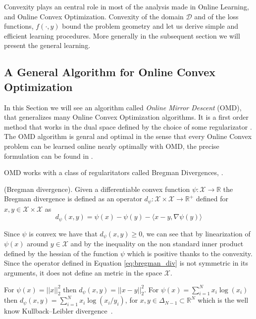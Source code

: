 Convexity plays an central role in most of the analysis made in Online Learning, and Online Convex Optimization. Convexity of the domain $\mathcal D$ and of the loss functions, $f(\cdot,y)$ bound the problem geometry and let us derive simple and efficient learning procedures. More generally in the subsequent section we will present the general learning. 

\subsection{A General Algorithm for Online Convex Optimization}

In this Section we will see an algorithm called \emph{Online Mirror Descent} (OMD), that generalizes many Online Convex Optimization algorithms. It is a first order method that works in the dual space defined by the choice of some regularizator . The OMD algorithm is genral and optimal in the sense that every Online Convex problem can be learned online nearly optimally with OMD, the precise formulation can be found in \cite{srebro2011universality}.

OMD works with a class of regularitators called Bregman Divergences, \cite{banerjee2005clustering}.

\begin{definition}(Bregman divergence). Given a differentiable convex function $\psi:\mathcal X\to\mathbb R$ the Bregman divergence is defined as an operator $d_{\psi}:\mathcal X\times\mathcal X\to \mathbb R^+$ defined for $x,y\in\mathcal X\times\mathcal X$ as 
\begin{equation}\label{eq:bregman_div}
d_\psi(x,y)=\psi(x)-\psi(y)-\langle x-y,\nabla \psi(y)\rangle
\end{equation}
\end{definition}

Since $\psi$ is convex we have that $d_\psi(x,y)\ge0$, we can see that by linearization of $\psi(x)$ around $y\in\mathcal X$ and by the inequality on the non standard inner product defined by the hessian of the function $\psi$ which is positive thanks to the convexity. Since the operator defined in Equation \eqref{eq:bregman_div} is not symmetric in its arguments, it does not define an metric in the space $\mathcal X$.

For $\psi(x)=||x||_2^2$ then $d_\psi(x,y)=||x-y||_2^2$. For $\psi(x)=\sum\limits_{i=1}^Nx_i\log(x_i)$ then $d_\psi(x,y)=\sum\limits_{i=1}^Nx_i\log(x_i/y_i)$, for $x,y\in\Delta_{N-1}\subset \mathbb R^N$ which is the well know Kullback–Leibler divergence~\cite{van2014renyi}.

